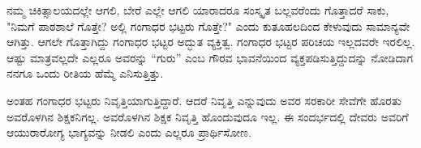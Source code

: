 {ನಮ್ಮ ಚಿಕಿತ್ಸಾಲಯದಲ್ಲೇ ಆಗಲಿ, ಬೇರೆ ಎಲ್ಲೇ ಆಗಲಿ  ಯಾರಾದರೂ ಸಂಸ್ಕೃತ ಬಲ್ಲವರೆಂದು ಗೊತ್ತಾದರೆ ಸಾಕು, "ನಿಮಗೆ ಪಾಠಶಾಲೆ ಗೊತ್ತೇ? ಅಲ್ಲಿ ಗಂಗಾಧರ ಭಟ್ಟರು ಗೊತ್ತೇ?" ಎಂದು ಕುತೂಹಲದಿಂದ ಕೇಳುವುದು ಸಾಮಾನ್ಯವೇ ಆಗಿತ್ತು. ಆಗಲೇ ಗೊತ್ತಾಗಿದ್ದು ಗಂಗಾಧರ ಭಟ್ಟರ ಅದ್ಭುತ ವ್ಯಕ್ತಿತ್ವ. ಗಂಗಾಧರ ಭಟ್ಟರ ಪರಿಚಯ ಇಲ್ಲದವರೇ ಇರಲಿಲ್ಲ. ಆಷ್ಟು ಮಾತ್ರವಲ್ಲದೇ ಎಲ್ಲರೂ ಅವರನ್ನು “ಗುರು” ಎಂಬ ಗೌರವ ಭಾವನೆಯಿಂದ ವ್ಯಕ್ತಪಡಿಸುತ್ತಿದ್ದುದನ್ನು ನೋಡಿದಾಗ ನನಗೂ ಒಂದು ರೀತಿಯ ಹೆಮ್ಮೆ ಎನಿಸುತ್ತಿತ್ತು.

ಅಂತಹ ಗಂಗಾಧರ ಭಟ್ಟರು ನಿವೃತ್ತಿಯಾಗುತ್ತಿದ್ದಾರೆ. ಆದರೆ ನಿವೃತ್ತಿ ಎನ್ನುವುದು ಅವರ ಸರಕಾರೀ ಸೇವೆಗೇ ಹೊರತು ಅವರೊಳಗಿನ ಶಿಕ್ಷಕನಿಗಲ್ಲ. ಅವರೊಳಗಿನ ಶಿಕ್ಷಕ ನಿವೃತ್ತಿ ಹೊಂದುವುದೂ ಇಲ್ಲ. ಈ ಸಂದರ್ಭದಲ್ಲಿ ದೇವರು ಅವರಿಗೆ ಆಯುರಾರೋಗ್ಯ ಭಾಗ್ಯವನ್ನು ನೀಡಲಿ ಎಂದು ಎಲ್ಲರೂ ಪ್ರಾರ್ಥಿಸೋಣ.

\articleend
}
